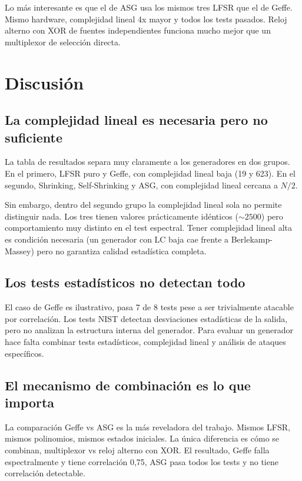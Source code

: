 Lo más interesante es que el de ASG usa los mismos tres LFSR que el de Geffe. Mismo hardware, complejidad lineal 4x mayor y todos los tests pasados.
Reloj alterno con XOR de fuentes independientes funciona mucho mejor que un multiplexor de selección directa.

\section{Discusión}

\subsection{La complejidad lineal es necesaria pero no suficiente}

La tabla de resultados separa muy claramente a los generadores en dos grupos. En el primero, LFSR puro y Geffe,
con complejidad lineal baja (19 y 623). En el segundo, Shrinking, Self-Shrinking y ASG, con complejidad lineal cercana a $N/2$.

Sin embargo, dentro del segundo grupo la complejidad lineal sola no permite distinguir nada.
Los tres tienen valores prácticamente idénticos ($\sim 2500$) pero comportamiento muy distinto en el test espectral.
Tener complejidad lineal alta es condición necesaria (un generador con LC baja cae frente a Berlekamp-Massey) pero no garantiza calidad estadística completa.

\subsection{Los tests estadísticos no detectan todo}

El caso de Geffe es ilustrativo, pasa 7 de 8 tests pese a ser trivialmente atacable por correlación.
Los tests NIST detectan desviaciones estadísticas de la salida, pero no analizan la estructura interna del generador.
Para evaluar un generador hace falta combinar tests estadísticos, complejidad lineal y análisis de ataques específicos.

\subsection{El mecanismo de combinación es lo que importa}

La comparación Geffe vs ASG es la más reveladora del trabajo. Mismos LFSR, mismos polinomios, mismos estados iniciales.
La única diferencia es cómo se combinan, multiplexor vs reloj alterno con XOR.
El resultado, Geffe falla espectralmente y tiene correlación 0,75, ASG pasa todos los tests y no tiene correlación detectable.

